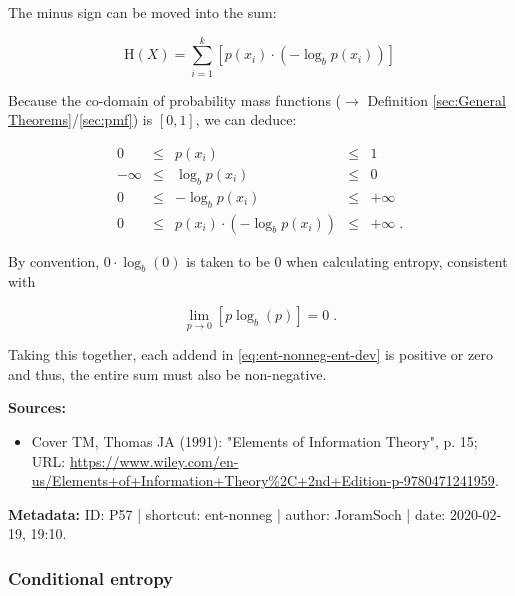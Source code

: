 \documentclass[a4paper,12pt,twoside]{book}
\begin{document}
The minus sign can be moved into the sum:

\begin{equation} \label{eq:ent-nonneg-ent-dev}
\mathrm{H}(X) = \sum_{i=1}^{k} \left[ p(x_i) \cdot \left( - \log_b p(x_i) \right) \right]
\end{equation}

Because the co-domain of probability mass functions ($\rightarrow$ Definition \ref{sec:General Theorems}/\ref{sec:pmf}) is $[0,1]$, we can deduce:

\begin{equation} \label{eq:ent-nonneg-nonneg}
\begin{array}{rcccl}
0 &\leq &p(x_i) &\leq &1 \\
-\infty &\leq &\log_b p(x_i) &\leq &0 \\
0 &\leq &-\log_b p(x_i) &\leq &+\infty \\
0 &\leq &p(x_i) \cdot \left(-\log_b p(x_i)\right) &\leq &+\infty \; .
\end{array}
\end{equation}

By convention, $0 \cdot \log_b(0)$ is taken to be $0$ when calculating entropy, consistent with

\begin{equation} \label{eq:ent-nonneg-lim-0log0}
\lim_{p \to 0} \left[ p \log_b(p) \right] = 0 \; .
\end{equation}

Taking this together, each addend in \eqref{eq:ent-nonneg-ent-dev} is positive or zero and thus, the entire sum must also be non-negative.


\vspace{1em}
\textbf{Sources:}
\begin{itemize}
\item Cover TM, Thomas JA (1991): "Elements of Information Theory", p. 15; URL: \url{https://www.wiley.com/en-us/Elements+of+Information+Theory%2C+2nd+Edition-p-9780471241959}.
\end{itemize}


\vspace{1em}
\textbf{Metadata:} ID: P57 | shortcut: ent-nonneg | author: JoramSoch | date: 2020-02-19, 19:10.
\vspace{1em}



\subsubsection[\textit{Conditional entropy}]{Conditional entropy} \label{sec:ent-cond}
\setcounter{equation}{0}
\end{document}
